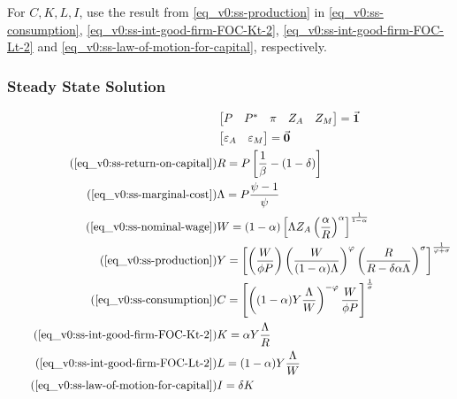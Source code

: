 \documentclass[
thesis.tex
]{subfiles}
\begin{document}
	For $C,K,L,I$, use the result from \ref{eq_v0:ss-production} in \ref{eq_v0:ss-consumption}, \ref{eq_v0:ss-int-good-firm-FOC-Kt-2}, \ref{eq_v0:ss-int-good-firm-FOC-Lt-2} and \ref{eq_v0:ss-law-of-motion-for-capital}, respectively.
	
	
	\subsubsection{Steady State Solution}
	
	\vspace*{-1cm}
	
	\begin{align}
		\label{eq_v0:unity-vector}
		& \begin{bmatrix}
			P & P^\ast & \pi & Z_A & Z_M
		\end{bmatrix} = \vec{\bm{1}} \\
		\label{eq_v0:null-vector}
		& \begin{bmatrix}
			\varepsilon_A & \varepsilon_{M}
		\end{bmatrix} = \vec{\bm{0}}\\
		\tag{\ref{eq_v0:ss-return-on-capital}}
		& R = P\left[ \frac{1}{\beta} - (1-\delta) \right] \\
		\tag{\ref{eq_v0:ss-marginal-cost}}
		& \Lambda = P \frac{\psi-1}{\psi} \\
		\tag{\ref{eq_v0:ss-nominal-wage}}
		& W = (1-\alpha) \left[ \Lambda Z_{A} \left( \frac{\alpha}{R} \right)^{\alpha} \right]^\frac{1}{1-\alpha} \\
		\tag{\ref{eq_v0:ss-production}}
		& Y =\left[
		\left( \frac{W}{\phi P}                \right)
		\left( \frac{W}{(1-\alpha)\Lambda}     \right)^\varphi
		\left( \frac{R}{R-\delta\alpha\Lambda} \right)^\sigma
		\right]^\frac{1}{\varphi+\sigma} \\
		\tag{\ref{eq_v0:ss-consumption}}
		& C = \left[ \left( (1-\alpha) Y \frac{\Lambda}{W} \right)^{-\varphi} \frac{W}{\phi P} \right]^{\frac{1}{\sigma}} \\
		\tag{\ref{eq_v0:ss-int-good-firm-FOC-Kt-2}}
		& K = \alpha Y \frac{\Lambda}{R} \\
		\tag{\ref{eq_v0:ss-int-good-firm-FOC-Lt-2}}
		& L = (1-\alpha) Y \frac{\Lambda}{W} \\
		\tag{\ref{eq_v0:ss-law-of-motion-for-capital}}
		& I = \delta K
	\end{align}
	
\end{document}
